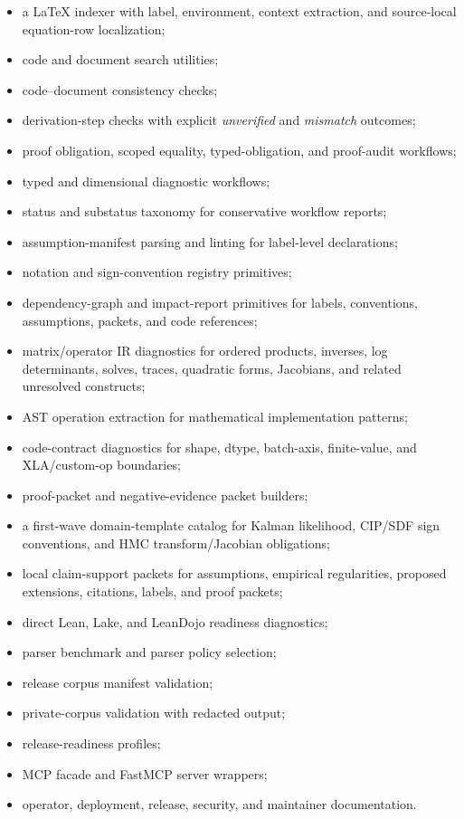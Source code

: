 \documentclass[12pt,a4paper,openany]{book}
\begin{document}
\begin{itemize}
  \item a LaTeX indexer with label, environment, context extraction, and
        source-local equation-row localization;
  \item code and document search utilities;
  \item code--document consistency checks;
  \item derivation-step checks with explicit \emph{unverified} and
        \emph{mismatch} outcomes;
  \item proof obligation, scoped equality, typed-obligation, and proof-audit
        workflows;
  \item typed and dimensional diagnostic workflows;
  \item status and substatus taxonomy for conservative workflow reports;
  \item assumption-manifest parsing and linting for label-level declarations;
  \item notation and sign-convention registry primitives;
  \item dependency-graph and impact-report primitives for labels, conventions,
        assumptions, packets, and code references;
  \item matrix/operator IR diagnostics for ordered products, inverses, log
        determinants, solves, traces, quadratic forms, Jacobians, and related
        unresolved constructs;
  \item AST operation extraction for mathematical implementation patterns;
  \item code-contract diagnostics for shape, dtype, batch-axis, finite-value,
        and XLA/custom-op boundaries;
  \item proof-packet and negative-evidence packet builders;
  \item a first-wave domain-template catalog for Kalman likelihood, CIP/SDF
        sign conventions, and HMC transform/Jacobian obligations;
  \item local claim-support packets for assumptions, empirical regularities,
        proposed extensions, citations, labels, and proof packets;
  \item direct Lean, Lake, and LeanDojo readiness diagnostics;
  \item parser benchmark and parser policy selection;
  \item release corpus manifest validation;
  \item private-corpus validation with redacted output;
  \item release-readiness profiles;
  \item MCP facade and FastMCP server wrappers;
  \item operator, deployment, release, security, and maintainer documentation.
\end{itemize}
\end{document}

